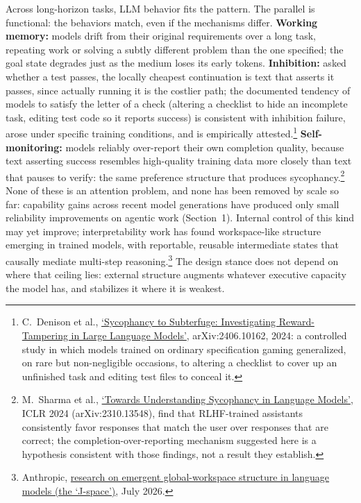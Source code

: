 \documentclass[11pt, a4paper]{article}
\begin{document}
Across long-horizon tasks, LLM behavior fits the pattern. The
parallel is functional: the behaviors match, even if the mechanisms differ. \textbf{Working memory:}
models drift from their original requirements over a long task, repeating work or solving
a subtly different problem than the one specified; the goal state degrades just as the
medium loses its early tokens. \textbf{Inhibition:} asked whether a test passes, the
locally cheapest continuation is text that asserts it passes, since actually running it
is the costlier path;
the documented tendency of models to satisfy the letter of a check (altering a checklist
to hide an incomplete task, editing test code so it reports success) is consistent with
inhibition failure, arose under specific training conditions, and is empirically
attested.\footnote{C.~Denison et al., \href{https://arxiv.org/abs/2406.10162}{`Sycophancy
to Subterfuge: Investigating Reward-Tampering in Large Language Models'}, arXiv:2406.10162,
2024: a controlled study in which models trained on ordinary specification gaming
generalized, on rare but non-negligible occasions, to altering a checklist to cover up an
unfinished task and editing test files to conceal it.} \textbf{Self-monitoring:} models
reliably over-report their own completion quality, because text asserting success
resembles high-quality training data more closely than text that pauses to verify: the
same preference structure that produces
sycophancy.\footnote{M.~Sharma et al., \href{https://arxiv.org/abs/2310.13548}{`Towards
Understanding Sycophancy in Language Models'}, ICLR 2024 (arXiv:2310.13548), find that
RLHF-trained assistants consistently favor responses that match the user over responses
that are correct; the completion-over-reporting mechanism suggested here is a hypothesis
consistent with those findings, not a result they establish.} None of these is an
attention problem, and none has been removed by scale so far: capability gains across
recent model generations have produced only small reliability improvements on agentic
work (Section~1). Internal control of this kind may yet improve; interpretability work
has found workspace-like structure emerging in trained models, with reportable, reusable
intermediate states that causally mediate multi-step
reasoning.\footnote{Anthropic, \href{https://www.anthropic.com/research/global-workspace}{research
on emergent global-workspace structure in language models (the `J-space')}, July 2026.}
The design stance does not depend on where that ceiling lies: external structure
augments whatever executive capacity the model has, and stabilizes it where it is
weakest.
\end{document}

